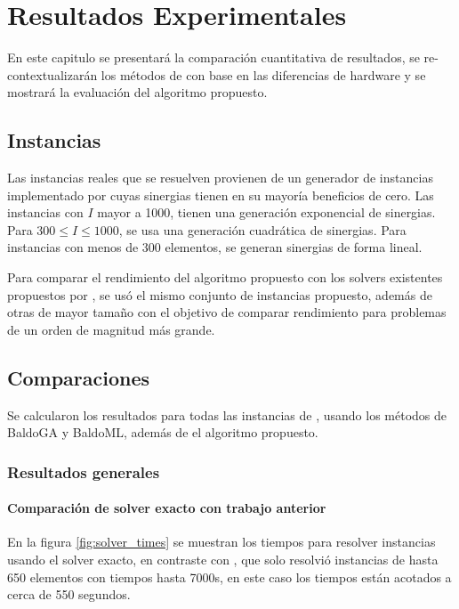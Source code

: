 \documentclass[spanish, a4paper, 12pt, openany,final]{book}
\begin{document}
\clearpage
\chapter{Resultados Experimentales}
En este capitulo se presentará la comparación cuantitativa de resultados, se re-contextualizarán los métodos de \cite{baldo_polynomial_2023} con base en las diferencias de hardware y se mostrará la evaluación del algoritmo propuesto.

\section{Instancias}

Las instancias reales que se resuelven provienen de un generador de instancias implementado por \cite{baldo_polynomial_2023} cuyas sinergias tienen en su mayoría beneficios de cero. Las instancias con $I$ mayor a 1000, tienen una generación exponencial de sinergias. Para $300 \le I \le 1000$, se usa una generación cuadrática de sinergias. Para instancias con menos de 300 elementos, se generan sinergias de forma lineal.

Para comparar el rendimiento del algoritmo propuesto con los solvers existentes propuestos por \cite{baldo_polynomial_2023}, se usó el mismo conjunto de instancias propuesto, además de otras de mayor tamaño con el objetivo de comparar rendimiento para problemas de un orden de magnitud más grande.

\section{Comparaciones}

Se calcularon los resultados para todas las instancias de \cite{baldo_polynomial_2023}, usando los métodos de BaldoGA y BaldoML, además de el algoritmo propuesto.

\subsection*{Resultados generales}
\subsubsection*{Comparación de solver exacto con trabajo anterior}
En la figura \ref{fig:solver_times} se muestran los tiempos para resolver instancias usando el solver exacto, en contraste con \cite{baldo_polynomial_2023}, que solo resolvió instancias de hasta 650 elementos con tiempos hasta 7000s, en este caso los tiempos están acotados a cerca de 550 segundos.
\end{document}
